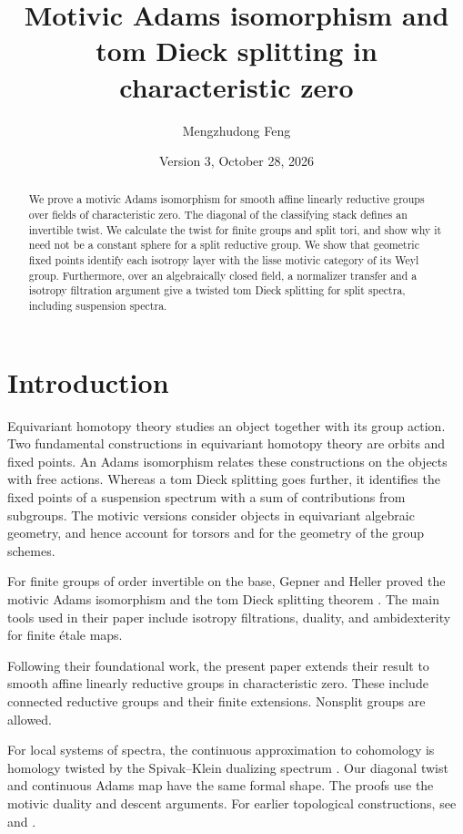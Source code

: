 \documentclass[11pt,reqno]{amsart}
\title[Motivic Adams Isomorphism]{Motivic Adams isomorphism and tom Dieck splitting in characteristic zero}
\author{Mengzhudong Feng}
\date{Version 3, October 28, 2026}
\theoremstyle{definition}
\theoremstyle{remark}
\theoremstyle{plain}
\numberwithin{equation}{section}
\begin{document}
\begin{abstract}
We prove a motivic Adams isomorphism for smooth affine
linearly reductive groups over fields of characteristic zero.
The diagonal of the classifying stack defines an invertible twist.
We calculate the twist for finite groups and split tori, and show why
it need not be a constant sphere for a split reductive group.
We show that geometric fixed points identify each isotropy layer with the lisse
motivic category of its Weyl group.
Furthermore, over an algebraically closed field, a normalizer transfer and a
isotropy filtration argument give a twisted tom Dieck splitting
for split spectra, including suspension spectra.
\end{abstract}
\maketitle
\setcounter{tocdepth}{1}
\tableofcontents
\section{Introduction}\label{sec:introduction}

Equivariant homotopy theory studies an object together with its group action.
Two fundamental constructions in equivariant homotopy theory are orbits and fixed points.
An Adams isomorphism relates these constructions on the objects with free actions.
Whereas a tom Dieck splitting goes further, it identifies the fixed points of a
suspension spectrum with a sum of contributions from subgroups.
The motivic versions consider objects in equivariant algebraic geometry, 
and hence account for torsors and for the geometry of
the group schemes.

For finite groups of order invertible on the base, Gepner and Heller
proved the motivic Adams isomorphism and the tom Dieck splitting theorem
\cite[Theorems~6.33 and 7.4]{GH}. 
The main tools used in their paper include isotropy filtrations, duality, 
and ambidexterity for finite \'etale maps. 

Following their foundational work, the present paper extends their result to 
smooth affine linearly reductive groups in characteristic zero. 
These include connected reductive groups and
their finite extensions. Nonsplit groups are allowed.

For local systems of spectra, the continuous approximation to cohomology
is homology twisted by the Spivak--Klein dualizing spectrum
\cite[Theorem~I.4.1 and Definition~I.4.2]{NikolausScholze}.
Our diagonal twist and continuous Adams map have the same formal shape.
The proofs use the motivic duality and descent arguments.
For earlier topological constructions, see
\cite[Theorem~D and Definition~1.3]{KleinDualizing} and
\cite[Definition~5.2.2]{RognesDualizable}.
\end{document}
